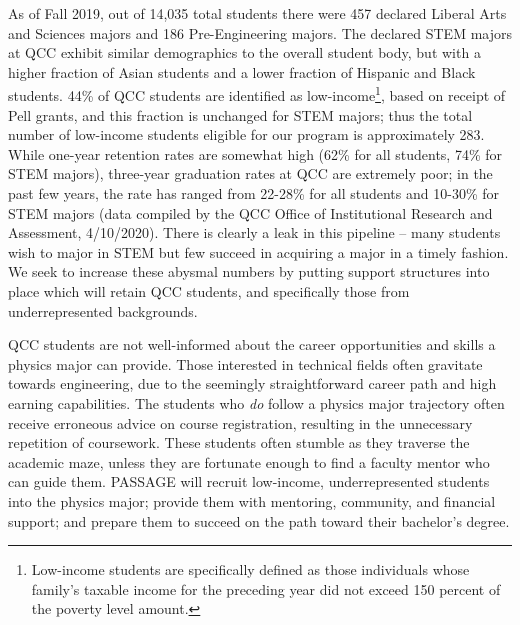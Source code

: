 \documentclass[12pt]{article}
\newcommand\new[1]{{\color{blue}#1}}
\begin{document}
As of Fall 2019, out of 14,035 total students there were 457 declared Liberal Arts and Sciences majors and 186 Pre-Engineering majors.  The declared STEM majors at QCC exhibit similar demographics to the overall student body, but with a higher fraction of Asian students and a lower fraction of Hispanic and Black students.   44\% of QCC students are identified as low-income\footnote{Low-income students are specifically defined as those individuals whose family's taxable income for the preceding year did not exceed 150 percent of the poverty level amount.}, based on receipt of Pell grants, and this fraction is unchanged for STEM majors; \new{ thus the total number of low-income students eligible for our program is approximately 283. } While one-year retention rates are somewhat high (62\% for all students, 74\% for STEM majors), three-year graduation rates at QCC are extremely poor; in the past few years, the rate has ranged from 22-28\% for all students and 10-30\% for STEM majors (data compiled by the QCC Office of Institutional Research and Assessment, 4/10/2020).  There is clearly a leak in this pipeline -- many students wish to major in STEM but few succeed in acquiring a major in a timely fashion.  We seek to increase these abysmal numbers by putting support structures into place which will retain QCC students, and specifically those from underrepresented backgrounds.




QCC students are not well-informed about the career opportunities and skills a physics major can provide.  
Those interested in technical fields often gravitate towards engineering, due to the seemingly straightforward career path and high earning capabilities.  The students who {\em do} follow a physics major trajectory often receive erroneous advice on course registration, resulting in the unnecessary repetition of coursework.  These students often stumble as they traverse the academic maze, unless they are fortunate enough to find a faculty mentor who can guide them.  PASSAGE will recruit low-income, underrepresented students into the physics major; provide them with mentoring, community, and financial support; and prepare them to succeed on the path toward their bachelor's degree.\\
\vspace{-3mm}
\end{document}
